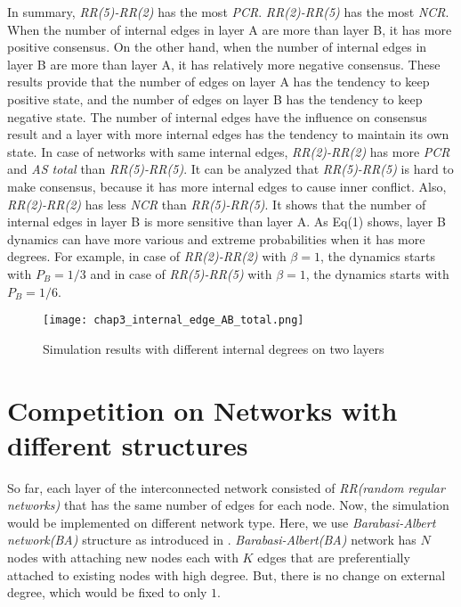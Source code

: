 In summary,  
\textit{RR(5)-RR(2)} has the most \textit{PCR}. \textit{RR(2)-RR(5)} has the most \textit{NCR}. When the number of internal edges in layer A are more than layer B, it has more positive consensus. On the other hand, when the number of internal edges in layer B are more than layer A, it has relatively more negative consensus. These results provide that the number of edges on layer A has the tendency to keep positive state, and the number of edges on layer B has the tendency to keep negative state. The number of internal edges have the influence on consensus result and a layer with more internal edges has the tendency to maintain its own state. In case of networks with same internal edges, \textit{RR(2)-RR(2)} has more \textit{PCR} and \textit{AS total} than \textit{RR(5)-RR(5)}. It can be analyzed that \textit{RR(5)-RR(5)} is hard to make consensus, because it has more internal edges to cause inner conflict. Also, \textit{RR(2)-RR(2)} has less \textit{NCR} than \textit{RR(5)-RR(5)}. It shows that the number of internal edges in layer B is more sensitive than layer A. As Eq(1) shows, layer B dynamics can have more various and extreme probabilities when it has more degrees. For example, in case of \textit{RR(2)-RR(2)} with $\beta = 1$, the dynamics starts with $P_B=1/3$ and in case of \textit{RR(5)-RR(5)} with $\beta = 1$, the dynamics starts with $P_B=1/6$. 

\begin{figure}[!htb]
	\centering
	\texttt{[image: chap3\_internal\_edge\_AB\_total.png]}
	\caption{Simulation results with different internal degrees on two layers}
	\label{chap3_internal_edge_AB_total}
\end{figure}

\section{Competition on Networks with different structures}
So far, each layer of the interconnected network consisted of \textit{RR(random regular networks)} that has the same number of edges for each node. Now, the simulation would be implemented on different network type. Here, we use \textit{Barabasi-Albert network(BA)} structure as introduced in \cite{barabasi1999}. \textit{Barabasi-Albert(BA)} network has $N$ nodes with attaching new nodes each with $K$ edges that are preferentially attached to existing nodes with high degree. But, there is no change on external degree, which would be fixed to only $1$.

